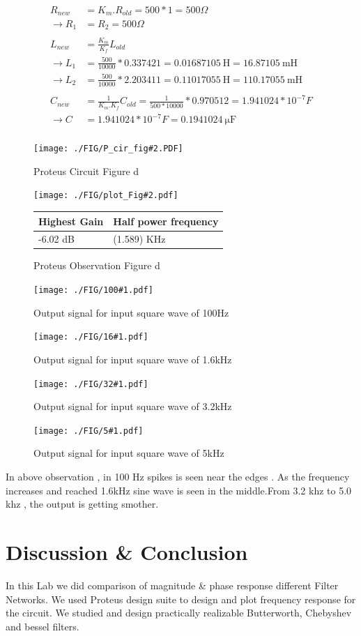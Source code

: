 \documentclass[a4paper,11pt]{article}
\newcommand{\Porcirobs}[4]{
    \begin{figure}[H] %
        \centering
        \texttt{[image: ./FIG/P\_cir\_fig\#2.PDF]}
        \caption{Proteus Circuit Figure #2}
    \end{figure}



    \begin{figure}[H]  %
        \centering
        \texttt{[image: ./FIG/plot\_Fig\#2.pdf]}
        \begin{tabular}[H]{| m{12em}| m{20em}|}
            \hline
            \rowcolor[rgb]{0.569,0.647,0.947} \textbf{Highest Gain } & \textbf{Half power frequency} \\ \hline
            #3 dB         & (#4) KHz     \\  \hline
        \end{tabular}
        \caption{Proteus Observation Figure #2}
    \end{figure}
}
\newcommand{\obsh}[1]{
 \begin{figure}[H]%
    \centering
    \texttt{[image: ./FIG/100\#1.pdf]}
    \caption{Output signal for input square wave of 100Hz}
\end{figure}
}
\newcommand{\obss}[1]{
\begin{figure}[H]%
    \centering
    \texttt{[image: ./FIG/16\#1.pdf]}
    \caption{Output signal for input square wave of 1.6kHz}
\end{figure}
}
\newcommand{\obst}[1]{
\begin{figure}[H]%
    \centering
    \texttt{[image: ./FIG/32\#1.pdf]}
    \caption{Output signal for input square wave of 3.2kHz}
\end{figure}
}
\newcommand{\obsf}[1]{
\begin{figure}[H]%
    \centering
    \texttt{[image: ./FIG/5\#1.pdf]}
    \caption{Output signal for input square wave of 5kHz}
\end{figure}
}
\begin{document}
\begin{align*}
    R_{new}         & =K_m.R_{old}=500 *1= 500 \Omega                                                      \\
    \rightarrow R_1 & =R_2=500 \Omega                                                                      \\\\
    L_{new}         & =\frac{K_m}{K_f}L_{old}                                                              \\
    \rightarrow L_1 & =\frac{500}{10000}*0.337421=\SI {0.01687105} {\henry}=\SI {16.87105} {\milli\henry}  \\
    \rightarrow L_2 & =\frac{500}{10000}*2.203411=\SI {0.11017055} {\henry}=\SI {110.17055} {\milli\henry} \\\\
    C_{new}         & =\frac{1}{K_m.K_f}C_{old}=\frac{1}{500*10000}*0.970512=1.941024*10^{-7} F            \\
    \rightarrow C   & =1.941024*10^{-7} F=\SI{0.1941024}{\micro \farad}                                    \\
\end{align*}



\Porcirobs{0.85}{d}{-6.02}{1.589}%

\obsh{d}
\obss{d}
\obst{d}
\obsf{d}

In above observation , in 100 Hz spikes is seen near the edges . As the frequency increases and reached 1.6kHz sine wave is seen in the middle.From 3.2 khz to 5.0 khz , the output is  getting smother.


\section{Discussion \& Conclusion}
In this Lab  we did comparison of magnitude \& phase response different Filter Networks. We used  Proteus  design suite to design and plot frequency response for the circuit. We studied and design practically realizable Butterworth, Chebyshev and bessel filters.
\end{document}
